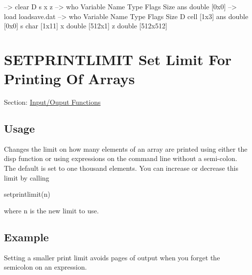 \begin{DoxyVerbInclude}
--> clear D s x z
--> who
  Variable Name       Type   Flags             Size
            ans    double                    [0x0]
--> load loadsave.dat
--> who
  Variable Name       Type   Flags             Size
              D      cell                    [1x3]
            ans    double                    [0x0]
              s      char                    [1x11]
              x    double                    [512x1]
              z    double                    [512x512]
\end{DoxyVerbInclude}
 \hypertarget{io_setprintlimit}{}\section{S\-E\-T\-P\-R\-I\-N\-T\-L\-I\-M\-I\-T Set Limit For Printing Of Arrays}\label{io_setprintlimit}
Section\-: \hyperlink{sec_io}{Input/\-Ouput Functions} \hypertarget{vtkwidgets_vtkxyplotwidget_Usage}{}\subsection{Usage}\label{vtkwidgets_vtkxyplotwidget_Usage}
Changes the limit on how many elements of an array are printed using either the {\ttfamily disp} function or using expressions on the command line without a semi-\/colon. The default is set to one thousand elements. You can increase or decrease this limit by calling \begin{DoxyVerb}  setprintlimit(n)
\end{DoxyVerb}
 where {\ttfamily n} is the new limit to use. \hypertarget{variables_struct_Example}{}\subsection{Example}\label{variables_struct_Example}
Setting a smaller print limit avoids pages of output when you forget the semicolon on an expression.


